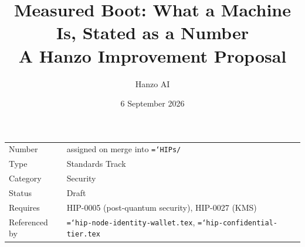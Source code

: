 \documentclass[11pt,a4paper]{article}
\title{\textbf{Measured Boot: What a Machine Is, Stated as a Number}\\[6pt]
\large A Hanzo Improvement Proposal}
\author{Hanzo AI}
\date{6 September 2026}
\newcommand{\code}[1]{\texttt{\hyphenchar\font=`\-\relax #1}}
\begin{document}
\maketitle

\begin{center}
\begin{tabular}{@{}ll@{}}
\toprule
Number      & assigned on merge into \code{HIPs/} \\
Type        & Standards Track \\
Category    & Security \\
Status      & Draft \\
Requires    & HIP-0005 (post-quantum security), HIP-0027 (KMS) \\
Referenced by & \code{hip-node-identity-wallet.tex}, \code{hip-confidential-tier.tex} \\
\bottomrule
\end{tabular}
\end{center}
\end{document}
